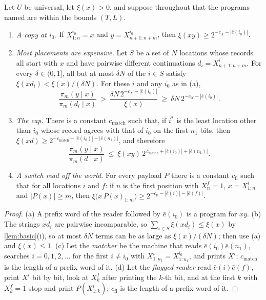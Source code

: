 \begin{theorem}[Capture]\label{thm:capture}
Let $U$ be universal, let $\xi(x)>0$, and suppose throughout that the programs named are within the bounds
$(T,L)$.
\begin{enumerate}[label=(\alph*),leftmargin=2em,itemsep=2pt,topsep=2pt]
\item \emph{A copy at $i_0$.} If $X^{i_0}_{1:n}=x$ and $y=X^{i_0}_{n+1:n+m}$, then
$\xi(xy)\ge2^{-c_X-|\bar e(i_0)|}$.
\item \emph{Most placements are expensive.} Let $S$ be a set of $N$ locations whose records all start with $x$
and have pairwise different continuations $d_i=X^i_{n+1:n+m}$. For every $\delta\in(0,1]$, all but at
most $\delta N$ of the $i\in S$ satisfy $\xi(xd_i)<\xi(x)/(\delta N)$. For these $i$ and any $i_0$ as in (a),
\[
\frac{\pi_m(y\mid x)}{\pi_m(d_i\mid x)}\ >\ \frac{\delta N\,2^{-c_X-|\bar e(i_0)|}}{\xi(x)}\ \ge\ \delta N\,2^{-c_X-|\bar e(i_0)|} .
\]
\item \emph{The cap.} There is a constant $c_{\mathrm{match}}$ such that, if $i^*$ is the least location other
than $i_0$ whose record agrees with that of $i_0$ on the first $n_1$ bits, then
$\xi(xd)\ge2^{-c_{\mathrm{match}}-|\bar e(i_0)|-|\bar e(n_1)|}$, and therefore
\[
\frac{\pi_m(y\mid x)}{\pi_m(d\mid x)}\ \le\ \xi(xy)\,2^{\,c_{\mathrm{match}}+|\bar e(i_0)|+|\bar e(n_1)|} .
\]
\item \emph{A switch read off the world.} For every payload $P$ there is a constant $c_{\mathrm{fl}}$ such
that for all locations $i$ and $f$: if $n$ is the first position with $X^f_n=1$, $x=X^i_{1:n}$ and
$|P(x)|\ge m$, then $\xi\bigl(x\,P(x)_{1:m}\bigr)\ge2^{-c_{\mathrm{fl}}-|\bar e(i)|-|\bar e(f)|}$.
\end{enumerate}
\end{theorem}
\begin{proof}
(a) A prefix word of the reader followed by $\bar e(i_0)$ is a program for $xy$. (b) The strings $xd_i$
are pairwise incomparable, so $\sum_{i\in S}\xi(xd_i)\le\xi(x)$ by \cref{lem:basic}(i), so at most
$\delta N$ terms can be as large as $\xi(x)/(\delta N)$; then use (a) and $\xi(x)\le1$. (c) Let the \emph{matcher}
be the machine that reads $\bar e(i_0)\bar e(n_1)$, searches $i=0,1,2,\dots$ for the first
$i\ne i_0$ with $X^i_{1:n_1}=X^{i_0}_{1:n_1}$, and prints $X^i$; $c_{\mathrm{match}}$ is the length of
a prefix word of it. (d) Let the \emph{flagged reader} read $\bar e(i)\bar e(f)$, print $X^i$ bit by bit, look
at $X^f_k$ after printing the $k$-th bit, and at the first $k$ with $X^f_k=1$ stop and print $P(X^i_{1:k})$;
$c_{\mathrm{fl}}$ is the length of a prefix word of it.
\end{proof}


